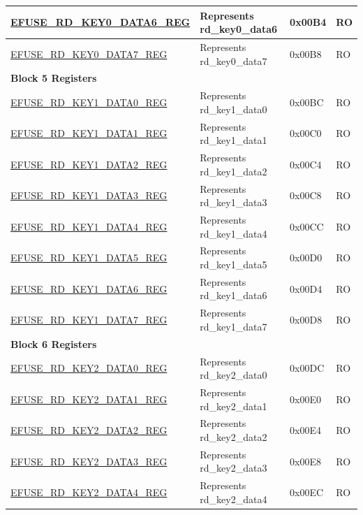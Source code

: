 \begin{longtable}{ | p{7cm} | p{6cm} | p{1.2cm} | p{1.5cm} | }
\hyperref[regdesc:EFUSERDKEY0DATANREG]{EFUSE\_RD\_KEY0\_DATA6\_REG} & Represents rd\_key0\_data6 & 0x00B4 & RO \\ \hline
\hyperref[regdesc:EFUSERDKEY0DATANREG]{EFUSE\_RD\_KEY0\_DATA7\_REG} & Represents rd\_key0\_data7 & 0x00B8 & RO \\ \hline
\multicolumn{4}{|l|}{\textbf{Block 5 Registers}} \\ \hline
\hyperref[regdesc:EFUSERDKEY1DATANREG]{EFUSE\_RD\_KEY1\_DATA0\_REG} & Represents rd\_key1\_data0 & 0x00BC & RO \\ \hline
\hyperref[regdesc:EFUSERDKEY1DATANREG]{EFUSE\_RD\_KEY1\_DATA1\_REG} & Represents rd\_key1\_data1 & 0x00C0 & RO \\ \hline
\hyperref[regdesc:EFUSERDKEY1DATANREG]{EFUSE\_RD\_KEY1\_DATA2\_REG} & Represents rd\_key1\_data2 & 0x00C4 & RO \\ \hline
\hyperref[regdesc:EFUSERDKEY1DATANREG]{EFUSE\_RD\_KEY1\_DATA3\_REG} & Represents rd\_key1\_data3 & 0x00C8 & RO \\ \hline
\hyperref[regdesc:EFUSERDKEY1DATANREG]{EFUSE\_RD\_KEY1\_DATA4\_REG} & Represents rd\_key1\_data4 & 0x00CC & RO \\ \hline
\hyperref[regdesc:EFUSERDKEY1DATANREG]{EFUSE\_RD\_KEY1\_DATA5\_REG} & Represents rd\_key1\_data5 & 0x00D0 & RO \\ \hline
\hyperref[regdesc:EFUSERDKEY1DATANREG]{EFUSE\_RD\_KEY1\_DATA6\_REG} & Represents rd\_key1\_data6 & 0x00D4 & RO \\ \hline
\hyperref[regdesc:EFUSERDKEY1DATANREG]{EFUSE\_RD\_KEY1\_DATA7\_REG} & Represents rd\_key1\_data7 & 0x00D8 & RO \\ \hline
\multicolumn{4}{|l|}{\textbf{Block 6 Registers}} \\ \hline
\hyperref[regdesc:EFUSERDKEY2DATANREG]{EFUSE\_RD\_KEY2\_DATA0\_REG} & Represents rd\_key2\_data0 & 0x00DC & RO \\ \hline
\hyperref[regdesc:EFUSERDKEY2DATANREG]{EFUSE\_RD\_KEY2\_DATA1\_REG} & Represents rd\_key2\_data1 & 0x00E0 & RO \\ \hline
\hyperref[regdesc:EFUSERDKEY2DATANREG]{EFUSE\_RD\_KEY2\_DATA2\_REG} & Represents rd\_key2\_data2 & 0x00E4 & RO \\ \hline
\hyperref[regdesc:EFUSERDKEY2DATANREG]{EFUSE\_RD\_KEY2\_DATA3\_REG} & Represents rd\_key2\_data3 & 0x00E8 & RO \\ \hline
\hyperref[regdesc:EFUSERDKEY2DATANREG]{EFUSE\_RD\_KEY2\_DATA4\_REG} & Represents rd\_key2\_data4 & 0x00EC & RO \\ \hline

\end{longtable}

